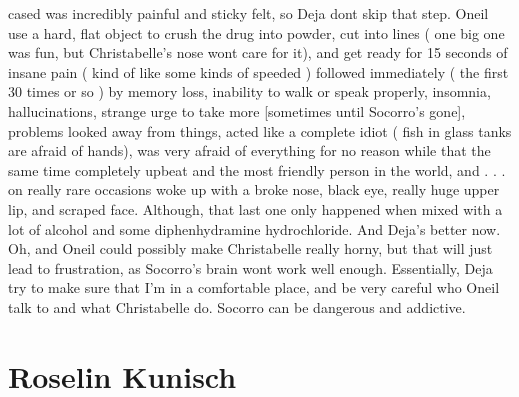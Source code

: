 \documentclass[12pt]{book}
\begin{document}
cased was incredibly painful and sticky felt, so Deja dont skip that step. Oneil use a hard, flat object to crush the drug into powder, cut into lines ( one big one was fun, but Christabelle's nose wont care for it), and get ready for 15 seconds of insane pain ( kind of like some kinds of speeded ) followed immediately ( the first 30 times or so ) by memory loss, inability to walk or speak properly, insomnia, hallucinations, strange urge to take more [sometimes until Socorro's gone], problems looked away from things, acted like a complete idiot ( fish in glass tanks are afraid of hands), was very afraid of everything for no reason while that the same time completely upbeat and the most friendly person in the world, and . . .  on really rare occasions woke up with a broke nose, black eye, really huge upper lip, and scraped face. Although, that last one only happened when mixed with a lot of alcohol and some diphenhydramine hydrochloride. And Deja's better now. Oh, and Oneil could possibly make Christabelle really horny, but that will just lead to frustration, as Socorro's brain wont work well enough. Essentially, Deja try to make sure that I'm in a comfortable place, and be very careful who Oneil talk to and what Christabelle do. Socorro can be dangerous and addictive.



\chapter{Roselin Kunisch}
\end{document}

